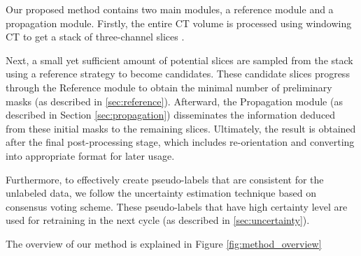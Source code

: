 Our proposed method contains two main modules, a reference module and a propagation module.
Firstly, the entire CT volume is processed using windowing CT to get a stack of three-channel slices \cite{windowingct17yahya}.


Next, a small yet sufficient amount of potential slices are sampled from the stack using a reference strategy to become candidates. These candidate slices progress through the Reference module to obtain the minimal number of preliminary masks (as described in \ref{sec:reference}).
Afterward, the Propagation module (as described in Section \ref{sec:propagation}) disseminates the information deduced from these initial masks to the remaining slices.
Ultimately, the result is obtained after the final post-processing stage, which includes re-orientation and converting into appropriate format for later usage.

Furthermore, to effectively create pseudo-labels that are consistent for the unlabeled data, we follow the uncertainty estimation technique based on consensus voting scheme. These pseudo-labels that have high certainty level are used for retraining in the next cycle (as described in \ref{sec:uncertainty}).

The overview of our method is explained in Figure \ref{fig:method_overview}